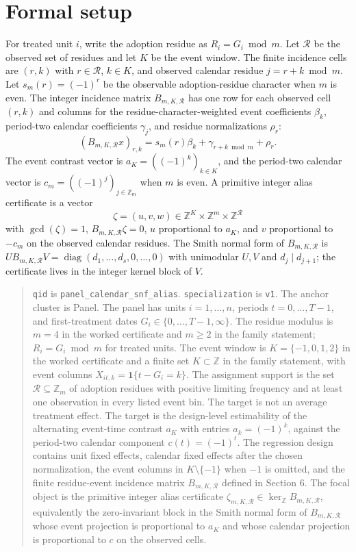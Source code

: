 \documentclass[11pt]{article}
\newcommand{\one}{\mathbf{1}}
\newcommand{\calR}{\mathcal{R}}
\theoremstyle{definition}
\theoremstyle{plain}
\theoremstyle{remark}
\begin{document}
\section{Formal setup}
For treated unit $i$, write the adoption residue as $R_i=G_i\bmod m$. Let $\calR$ be the observed set of residues and let $K$ be the event window. The finite incidence cells are $(r,k)$ with $r\in\calR$, $k\in K$, and observed calendar residue $j=r+k\bmod m$. Let $s_m(r)=(-1)^r$ be the observable adoption-residue character when $m$ is even. The integer incidence matrix $B_{m,K,\calR}$ has one row for each observed cell $(r,k)$ and columns for the residue-character-weighted event coefficients $\beta_k$, period-two calendar coefficients $\gamma_j$, and residue normalizations $\rho_r$:
\[
  (B_{m,K,\calR} x)_{r,k}
  = s_m(r)\beta_k+\gamma_{r+k\bmod m}+\rho_r .
\]
The event contrast vector is $a_K=( (-1)^k )_{k\in K}$, and the period-two calendar vector is $c_m=( (-1)^j )_{j\in\mathbb{Z}_m}$ when $m$ is even. A primitive integer alias certificate is a vector
\[
  \zeta=(u,v,w)\in\mathbb{Z}^{K}\times\mathbb{Z}^{m}\times\mathbb{Z}^{\calR}
\]
with $\gcd(\zeta)=1$, $B_{m,K,\calR}\zeta=0$, $u$ proportional to $a_K$, and $v$ proportional to $-c_m$ on the observed calendar residues. The Smith normal form of $B_{m,K,\calR}$ is $U B_{m,K,\calR} V=\operatorname{diag}(d_1,\ldots,d_s,0,\ldots,0)$ with unimodular $U,V$ and $d_j\mid d_{j+1}$; the certificate lives in the integer kernel block of $V$.

\begin{quote}
\texttt{qid} is \texttt{panel\_calendar\_snf\_alias}. \texttt{specialization} is \texttt{v1}. The anchor cluster is Panel. The panel has units $i=1,\ldots,n$, periods $t=0,\ldots,T-1$, and first-treatment dates $G_i\in\{0,\ldots,T-1,\infty\}$. The residue modulus is $m=4$ in the worked certificate and $m\geq 2$ in the family statement; $R_i=G_i\bmod m$ for treated units. The event window is $K=\{-1,0,1,2\}$ in the worked certificate and a finite set $K\subset\mathbb{Z}$ in the family statement, with event columns $X_{it,k}=\one\{t-G_i=k\}$. The assignment support is the set $\calR\subseteq\mathbb{Z}_m$ of adoption residues with positive limiting frequency and at least one observation in every listed event bin. The target is not an average treatment effect. The target is the design-level estimability of the alternating event-time contrast $a_K$ with entries $a_k=(-1)^k$, against the period-two calendar component $c(t)=(-1)^t$. The regression design contains unit fixed effects, calendar fixed effects after the chosen normalization, the event columns in $K\setminus\{-1\}$ when $-1$ is omitted, and the finite residue-event incidence matrix $B_{m,K,\calR}$ defined in Section 6. The focal object is the primitive integer alias certificate $\zeta_{m,K,\calR}\in\ker_{\mathbb{Z}} B_{m,K,\calR}$, equivalently the zero-invariant block in the Smith normal form of $B_{m,K,\calR}$ whose event projection is proportional to $a_K$ and whose calendar projection is proportional to $c$ on the observed cells.
\end{quote}
\end{document}
